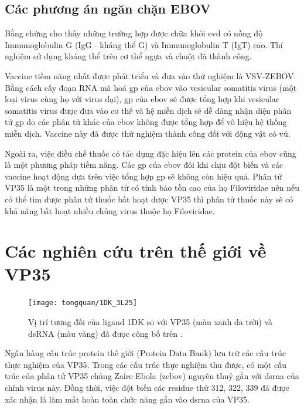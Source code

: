 \documentclass[12pt,a4paper,reqno, oneside]{book}
\begin{document}
\subsection{Các phương án ngăn chặn EBOV}
	Bằng chứng cho thấy những trường hợp được chữa khỏi \gls{evd} có nồng độ Immunoglobulin G (IgG - kháng thể G) và Immunoglobulin T (IgT) cao. Thí nghiệm sử dụng kháng thể trên cơ thể ngựa và chuột đã thành công\cite{Feldmann2003}.
	
	Vaccine tiềm năng nhất được phát triển và đưa vào thử nghiệm là VSV-ZEBOV. Bằng cách cấy đoạn RNA mã hoá \gls{gp} của \gls{ebov} vào vesicular somatitis virus (một loại virus cùng họ với virus dại), \gls{gp} của \gls{ebov} sẽ được tổng hợp khi vesicular somatitis virus được đưa vào cơ thể và hệ miễn dịch sẽ dễ dàng nhận diện phân tử \gls{gp} do các phân tử khác của \gls{ebov} không được tổng hợp để vô hiệu hệ thống miễn dịch. Vaccine này đã được thử nghiệm thành công đối với động vật có vú\cite{Mire2015}.
	
	Ngoài ra, việc điều chế thuốc có tác dụng đặc hiệu lên các protein của \gls{ebov} cũng là một phương pháp tiềm năng. Các \gls{gp} của \gls{ebov} đôi khi chịu đột biến và các vaccine hoạt động dựa trên việc tổng hợp \gls{gp} sẽ không còn hiệu quả. Phân tử VP35 là một trong những phân tử có tính bảo tồn cao của họ Filoviridae nên nếu có thể tìm được phân tử thuốc bất hoạt được VP35 thì phân tử thuốc này sẽ có khả năng bất hoạt nhiều chủng virus thuộc họ Filoviridae.
\section{Các nghiên cứu trên thế giới về VP35}
	\begin{figure}[t!]
	\centering
	\texttt{[image: tongquan/1DK\_3L25]}
	\caption{Vị trí tương đối của ligand 1DK so với VP35 (màu xanh da trời) và dsRNA (màu vàng) đã được công bố trên \cite{Brown2014}.}
	\label{fig:1dk_3l25}
	\end{figure}
	Ngân hàng cấu trúc protein thế giới (Protein Data Bank) lưu trữ các cấu trúc thực nghiệm của VP35. Trong các cấu trúc thực nghiệm thu được, có một cấu trúc của phân tử VP35 chủng Zaire Ebola (\gls{zebov}) nguyên thuỷ gắn với \gls{dsrna} của chính virus này\cite{Leung2010}. Đồng thời, việc đột biến các \gls{residue} thứ 312, 322, 339 đã được xác nhận là làm mất hoàn toàn chức năng gắn vào \gls{dsrna} của VP35\cite{Cardenas2006,Hartman2004}.
	
\end{document}
